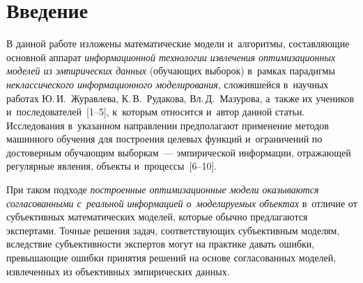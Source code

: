 \begin{multicols}{2}

\label{st\stat}



\section{Введение}

\vspace*{-3pt}


В данной работе изложены математические модели и~алгоритмы, 
составляющие основной аппарат \textit{информационной технологии извлечения 
оптимизационных моделей из эмпирических данных} (обучающих выборок)  
в~рамках парадигмы \textit{неклассического информационного моделирования}, 
сложившейся в~научных работах Ю.\,И.~Журавлева, К.\,В.~Рудакова, Вл.\,Д.~Мазурова, 
а~также их учеников и~последователей~[1--5], к~которым относится и~автор 
данной статьи.
%
Исследования в~указанном направлении предполагают применение методов 
машинного обучения для построения целевых функций и~ограничений  по 
достоверным обучающим выборкам~--- эмпирической информации, отражающей 
регулярные явления, объекты и~процессы~[6--10].

 При таком подходе 
\textit{построенные оптимизационные модели оказываются согласованными 
с~реальной информацией о~моделируемых объектах} в~отличие от 
субъективных математических моделей, которые обычно предлагаются экспертами. 
Точные решения задач, соответствующих субъективным моделям,  вследствие 
субъективности экспертов могут на практике давать ошибки, превышающие 
ошибки принятия решений на основе согласованных моделей, извлеченных 
из объективных эмпирических данных.


\end{multicols}
